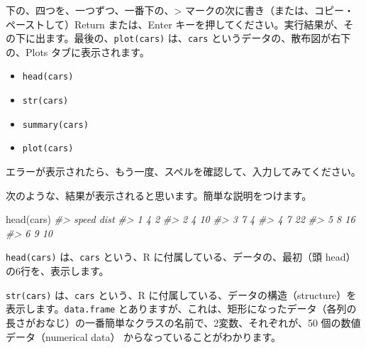 \documentclass[
]{bxjsbook}
\newenvironment{Shaded}{\begin{snugshade}}{\end{snugshade}}
\newcommand{\CommentTok}[1]{\textcolor[rgb]{0.56,0.35,0.01}{\textit{#1}}}
\newcommand{\FunctionTok}[1]{\textcolor[rgb]{0.00,0.00,0.00}{#1}}
\newcommand{\NormalTok}[1]{#1}
\providecommand{\tightlist}{%
  \setlength{\itemsep}{0pt}\setlength{\parskip}{0pt}}
\theoremstyle{definition}
\theoremstyle{definition}
\theoremstyle{definition}
\theoremstyle{definition}
\theoremstyle{remark}
\begin{document}
下の、四つを、一つずつ、一番下の、\textgreater{} マークの次に書き（または、コピー・ペーストして）Return または、Enter キーを押してください。実行結果が、その下に出ます。最後の、\texttt{plot(cars)} は、\texttt{cars} というデータの、散布図が右下の、Plots タブに表示されます。

\begin{itemize}
\tightlist
\item
  \texttt{head(cars)}
\item
  \texttt{str(cars)}
\item
  \texttt{summary(cars)}
\item
  \texttt{plot(cars)}
\end{itemize}

エラーが表示されたら、もう一度、スペルを確認して、入力してみてください。

次のような、結果が表示されると思います。簡単な説明をつけます。

\begin{Shaded}
\begin{Highlighting}[]
\FunctionTok{head}\NormalTok{(cars)}
\CommentTok{\#\textgreater{}   speed dist}
\CommentTok{\#\textgreater{} 1     4    2}
\CommentTok{\#\textgreater{} 2     4   10}
\CommentTok{\#\textgreater{} 3     7    4}
\CommentTok{\#\textgreater{} 4     7   22}
\CommentTok{\#\textgreater{} 5     8   16}
\CommentTok{\#\textgreater{} 6     9   10}
\end{Highlighting}
\end{Shaded}

\texttt{head(cars)} は、\texttt{cars} という、R に付属している、データの、最初（頭 head）の6行を、表示します。

\begin{Shaded}
\end{Shaded}

\texttt{str(cars)} は、\texttt{cars} という、R に付属している、データの構造（structure）を表示します。\texttt{data.frame} とありますが、これは、矩形になったデータ（各列の長さがおなじ）の一番簡単なクラスの名前で、2変数、それぞれが、50 個の数値データ（numerical data） からなっていることがわかります。
\end{document}
